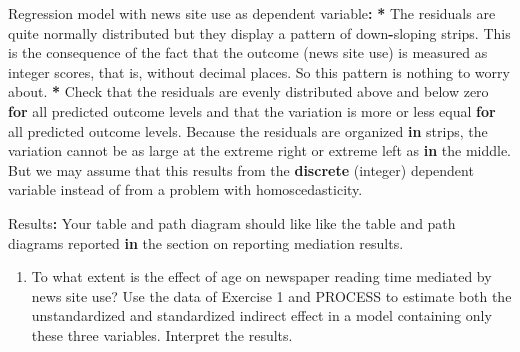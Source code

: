 \documentclass[a4paper]{book}
\newenvironment{Shaded}{\begin{snugshade}}{\end{snugshade}}
\newcommand{\KeywordTok}[1]{\textcolor[rgb]{0,0,0}{\textbf{#1}}}
\newcommand{\StringTok}[1]{\textcolor[rgb]{0.00,0.00,0.00}{#1}}
\newcommand{\ControlFlowTok}[1]{\textcolor[rgb]{0.00,0.00,0.00}{\textbf{#1}}}
\newcommand{\OperatorTok}[1]{\textcolor[rgb]{0.00,0.00,0.00}{\textbf{#1}}}
\newcommand{\ErrorTok}[1]{\textcolor[rgb]{0.00,0.00,0.00}{\textbf{#1}}}
\newcommand{\NormalTok}[1]{#1}
\providecommand{\tightlist}{%
  \setlength{\itemsep}{0pt}\setlength{\parskip}{0pt}}
\theoremstyle{definition}
\theoremstyle{definition}
\theoremstyle{definition}
\theoremstyle{remark}
\begin{document}
\begin{Shaded}
\begin{Highlighting}[]
\NormalTok{Regression model with news site use as dependent variable}\OperatorTok{:}\StringTok{  }
\StringTok{  }
\ErrorTok{*}\StringTok{ }\NormalTok{The residuals are quite normally distributed but they display a pattern of}
\NormalTok{down}\OperatorTok{-}\NormalTok{sloping strips. This is the consequence of the fact that the outcome}
\NormalTok{(news site use) is measured as integer scores, that is, without decimal}
\NormalTok{places. So this pattern is nothing to worry about.}
\OperatorTok{*}\StringTok{ }\NormalTok{Check that the residuals are evenly distributed above and below zero }\ControlFlowTok{for}\NormalTok{ all}
\NormalTok{predicted outcome levels and that the variation is more or less equal }\ControlFlowTok{for}\NormalTok{ all}
\NormalTok{predicted outcome levels. Because the residuals are organized }\ControlFlowTok{in}\NormalTok{ strips, the}
\NormalTok{variation cannot be as large at the extreme right or extreme left as }\ControlFlowTok{in}\NormalTok{ the}
\NormalTok{middle. But we may assume that this results from the }\KeywordTok{discrete}\NormalTok{ (integer)}
\NormalTok{dependent variable instead of from a problem with homoscedasticity.}
  
\NormalTok{Results}\OperatorTok{:}\StringTok{  }
\StringTok{  }
\NormalTok{Your table and path diagram should like like the table and path diagrams}
\NormalTok{reported }\ControlFlowTok{in}\NormalTok{ the section on reporting mediation results.}
\end{Highlighting}
\end{Shaded}

\begin{enumerate}
\def\labelenumi{\arabic{enumi}.}
\setcounter{enumi}{1}
\tightlist
\item
  To what extent is the effect of age on newspaper reading time mediated
  by news site use? Use the data of Exercise 1 and PROCESS to estimate
  both the unstandardized and standardized indirect effect in a model
  containing only these three variables. Interpret the results.
\end{enumerate}
\end{document}
